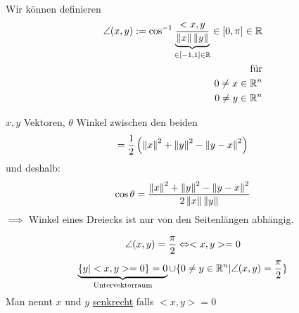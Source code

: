 \begin{Kor} Wir können definieren
\begin{align*}
  \angle(x,y):=\cos^{-1}\underbrace{\frac{<x,y}{\left\| x \right\|\left\| y \right\|}}_{\in [-1,1]\in\mathbb{R}} \in [0,\pi]\in\mathbb{R}\\
  \text{für}\\
  0\neq x\in\mathbb{R}^n\\
  0\neq y\in\mathbb{R}^n
\end{align*}
\end{Kor}
\begin{Kor}
$x,y$ Vektoren, $\theta$ Winkel zwischen den beiden
\[<x,y>=\frac{1}{2}\left(\Norm{x}^2+\Norm{y}^2-\Norm{y-x}^2\right)\]
und deshalb:
\[\cos\theta=\frac{\left\| x \right\|^2+\left\| y \right\|^2-\left\| y-x \right\|^2}{2\left\| x \right\|\left\| y \right\|}\]
$\implies$ Winkel eines Dreiecks ist nur von den Seitenlängen abhängig.
\end{Kor}
\begin{Bsp}
\[\angle(x,y)=\frac{\pi}{2}\Leftrightarrow <x,y>=0\]
\[\underbrace{\{y|<x,y>=0\}={0}}_{\text{Untervektorraum}}\cup\{0\neq y\in\mathbb{R}^n|\angle(x,y)=\frac{\pi}{2}\}\]
Man nennt $x$ und $y$ \underline{senkrecht} falls $<x,y>=0$
\end{Bsp}
